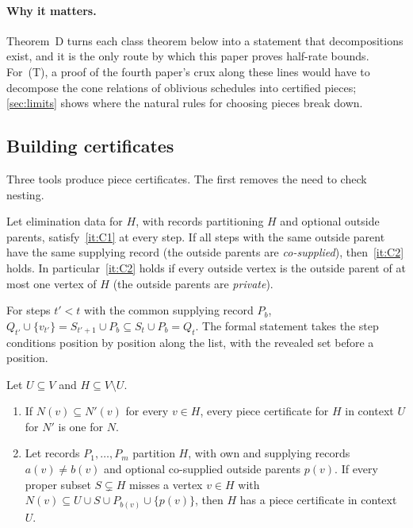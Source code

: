 \paragraph{Why it matters.} Theorem~D turns each class theorem below into a statement that decompositions exist, and
it is the only route by which this paper proves half-rate bounds. For~(T), a proof of the fourth paper's crux along
these lines would have to decompose the cone relations of oblivious schedules into certified pieces;
\cref{sec:limits} shows where the natural rules for choosing pieces break down.

\subsection{Building certificates}\label{sec:building}

Three tools produce piece certificates. The first removes the need to check nesting.

\begin{lemma}\label{lem:cosupply}
Let elimination data for $H$, with records partitioning $H$ and optional outside parents, satisfy~\ref{it:C1} at every
step. If all steps with the same outside parent have the same supplying record (the outside parents are
\emph{co-supplied}), then~\ref{it:C2} holds. In particular~\ref{it:C2} holds if every outside vertex is the outside
parent of at most one vertex of $H$ (the outside parents are \emph{private}).
\end{lemma}

\begin{outline}
For steps $t'<t$ with the common supplying record $P_b$,
$Q_{t'}\cup\{v_{t'}\}=S_{t'+1}\cup P_b\subseteq S_t\cup P_b=Q_t$. The formal statement takes the step conditions
position by position along the list, with  the revealed set before a position.
\end{outline}

\begin{lemma}\label{lem:greedy}
Let $U\subseteq V$ and $H\subseteq V\setminus U$.
\begin{enumerate}[label=(\alph*)]
\item\label{it:mono} If $N(v)\subseteq N'(v)$ for every $v\in H$, every piece certificate for $H$ in context $U$ for
$N'$ is one for $N$.
\item\label{it:greedy} Let records $P_1,\dots,P_m$ partition $H$, with own and supplying records $a(v)\ne b(v)$ and
optional co-supplied outside parents $p(v)$. If every proper subset $S\subsetneq H$ misses a vertex $v\in H$ with
$N(v)\subseteq U\cup S\cup P_{b(v)}\cup\{p(v)\}$, then $H$ has a piece certificate in context $U$.
\end{enumerate}
\end{lemma}

